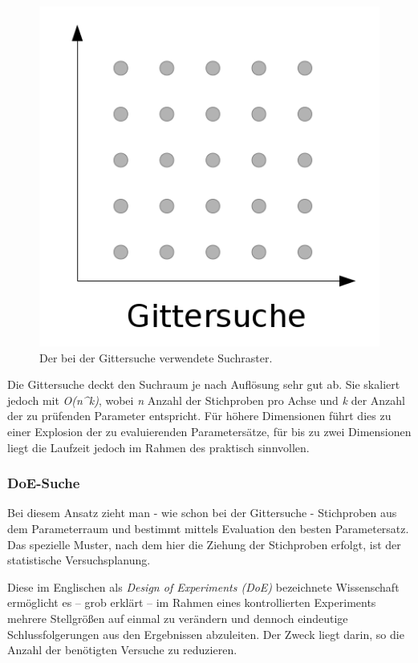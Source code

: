 \begin{figure}[!h]
	\centering
	\includegraphics[scale=1.0]{images/svm/Gittersuche.png} 
	\caption{Der bei der Gittersuche verwendete Suchraster.}
	\label{fig:Gittersuche}
\end{figure}

Die Gittersuche deckt den Suchraum je nach Auflösung sehr gut ab. Sie skaliert jedoch mit \textit{O(n^k)}, wobei \textit{n} Anzahl der Stichproben pro Achse und \textit{k} der Anzahl der zu prüfenden Parameter entspricht. Für höhere Dimensionen führt dies zu einer Explosion der zu evaluierenden Parametersätze, für bis zu zwei Dimensionen liegt die Laufzeit jedoch im Rahmen des praktisch sinnvollen.

\subsubsection{DoE-Suche}
\label{subsubsec:DoE-Suche}
Bei diesem Ansatz zieht man - wie schon bei der Gittersuche - Stichproben aus dem Parameterraum und bestimmt mittels Evaluation den besten Parametersatz. Das spezielle Muster, nach dem hier die Ziehung der Stichproben erfolgt, ist der  statistische Versuchsplanung.

Diese im Englischen als \textit{Design of Experiments (DoE)} bezeichnete Wissenschaft ermöglicht es – grob erklärt – im Rahmen eines kontrollierten Experiments mehrere Stellgrößen auf einmal zu verändern und dennoch eindeutige Schlussfolgerungen aus den Ergebnissen abzuleiten. Der Zweck liegt darin, so die Anzahl der benötigten Versuche zu reduzieren.

